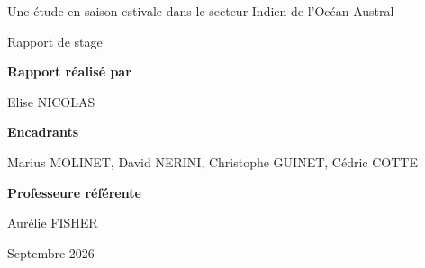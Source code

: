 \documentclass[11pt,a4paper,oneside]{report}
\begin{document}
\begin{titlepage}
		{\large
			Une étude en saison estivale dans le secteur Indien de l'Océan Austral
			\par}
		
		\vspace{0.25cm}
		
		{\large
			Rapport de stage
			\par}
		
		\vfill
		
		{\large\bfseries Rapport réalisé par\par}
		\vspace{0.15cm}
		{\large Elise NICOLAS\par}
		
		\vspace{0.55cm}
		
		{\large\bfseries Encadrants\par}
		\vspace{0.15cm}
		{\large
			Marius MOLINET, David NERINI, Christophe GUINET, Cédric COTTE
			\par}
		
		\vspace{0.55cm}
		
		{\large\bfseries Professeure référente\par}
		\vspace{0.15cm}
		{\large Aurélie FISHER\par}
		
		\vspace{0.55cm}
		
		{\large Septembre 2026\par}
		
		\vspace*{0.4cm}
		
	\end{titlepage}
	
\end{document}

